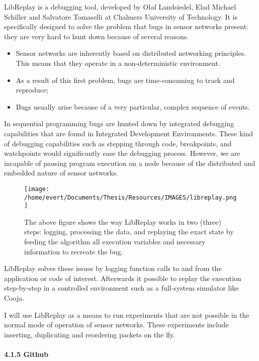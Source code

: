LibReplay is a debugging tool, developed by Olaf Landsiedel, Elad
Michael Schiller and Salvatore Tomaselli at Chalmers University of
Technology. It is specifically designed to solve the problem that bugs
in sensor networks present: they are very hard to hunt down because of
several reasons\cite{landsiedel2015libreplay}.

\begin{itemize}
\itemsep1pt\parskip0pt
\item
  Sensor networks are inherently based on distributed networking
  principles. This means that they operate in a non-deterministic
  environment.
\item
  As a result of this first problem, bugs are time-consuming to track
  and reproduce;
\item
  Bugs usually arise because of a very particular, complex sequence of
  events.
\end{itemize}

In sequential programming bugs are hunted down by integrated debugging
capabilities that are found in Integrated Development Environments.
These kind of debugging capabilities such as stepping through code,
breakpoints, and watchpoints would significantly ease the debugging
process. However, we are incapable of pausing program execution on a
node because of the distributed and embedded nature of sensor networks.

\begin{figure}[htbp]
\centering
\texttt{[image: /home/evert/Documents/Thesis/Resources/IMAGES/libreplay.png]}
\caption{The above figure shows the way LibReplay works in two (three)
steps: logging, processing the data, and replaying the exact state by
feeding the algorithm all execution variables and necessary information
to recreate the bug.}
\end{figure}

LibReplay solves these issues by logging function calls to and from the
application or code of interest. Afterwards it possible to replay the
execution step-by-step in a controlled environment such as a full-system
simulator like Cooja.

I will use LibReplay as a means to run experiments that are not possible
in the normal mode of operation of sensor networks. These experiments
include inserting, duplicating and reordering packets on the fly.

\paragraph{4.1.5 Github\\\\}\label{github}

